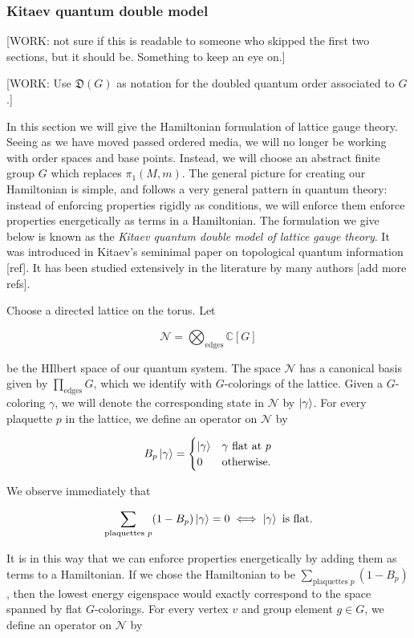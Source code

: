 \documentclass{article}
\theoremstyle{definition}
\newcommand{\CC}{\mathbb{C}}
\newcommand{\NN}{\mathcal{N}}
\newcommand{\DD}{\mathfrak{D}}
\newcommand{\0}{\left|0\right>}
\newcommand{\1}{\left|1\right>}
\numberwithin{figure}{section}
\begin{document}
\subsubsection{Kitaev quantum double model}

[WORK: not sure if this is readable to someone who skipped the first two sections, but it should be. Something to keep an eye on.]

[WORK: Use $\DD(G)$ as notation for the doubled quantum order associated to $G$.]

In this section we will give the Hamiltonian formulation of lattice gauge theory. Seeing as we have moved passed ordered media, we will no longer be working with order spaces and base points. Instead, we will choose an abstract finite group $G$ which replaces $\pi_1(M,m)$. The general picture for creating our Hamiltonian is simple, and follows a very general pattern in quantum theory: instead of enforcing properties rigidly as conditions, we will enforce them enforce properties energetically as terms in a Hamiltonian. The formulation we give below is known as the \textit{Kitaev quantum double model of lattice gauge theory}. It was introduced in Kitaev's seminimal paper on topological quantum information [ref]. It has been studied extensively in the literature by many authors [add more refs].

Choose a directed lattice on the torus. Let

$$\NN=\bigotimes_{\text{edges}}\CC[G]$$

be the HIlbert space of our quantum system. The space $\NN$ has a canonical basis given by $\prod_{\text{edges}}G$, which we  identify with $G$-colorings of the lattice. Given a $G$-coloring $\gamma$, we will denote the corresponding state in $\NN$ by $\ket{\gamma}$. For every plaquette $p$ in the lattice, we define an operator on $\NN$ by

$$B_p\ket{\gamma}=
\begin{cases}
\ket{\gamma} & \gamma \text{ flat at }p\\
0 & \text{otherwise}.
\end{cases}$$

We observe immediately that

$$\sum_{\text{plaquettes }p}(1-B_p)\ket{\gamma}=0 \iff \ket{\gamma} \text{ is flat.}$$

It is in this way that we can enforce properties energetically by adding them as terms to a Hamiltonian. If we chose the Hamiltonian to be $\sum_{\text{plaquettes }p}(1-B_p)$, then the lowest energy eigenspace would exactly correspond to the space spanned by flat $G$-colorings. For every vertex $v$ and group element $g\in G$, we define an operator on $\NN$ by
\end{document}
